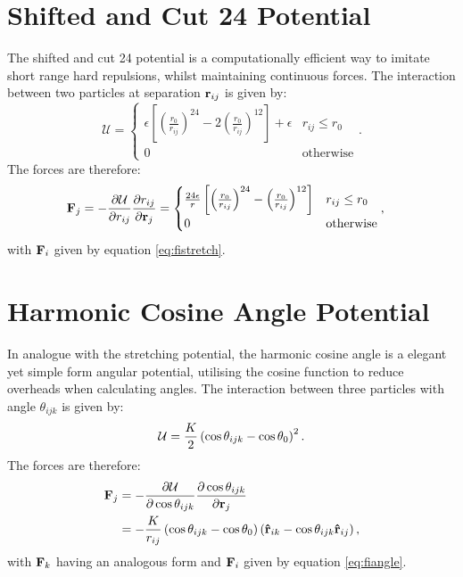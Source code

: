 \section{Shifted and Cut 24 Potential}

The shifted and cut 24 potential is a computationally efficient way to imitate short range hard repulsions, whilst maintaining continuous forces.
The interaction between two particles at separation $\mathbf{r}_{ij}$ is given by:
\begin{equation}
	\mathcal{U} = 
	\begin{cases}
	\epsilon \left[ \left(\frac{r_{0}}{r_{ij}}\right)^{24}-2\left(\frac{r_{0}}{r_{ij}}\right)^{12} \right] + \epsilon & r_{ij}\leq r_{0} \\
	0 & \text{otherwise}
	\end{cases}.
\end{equation}
The forces are therefore:
\begin{align}
	\mathbf{F}_j&=-\frac{\partial \mathcal{U}}{\partial r_{ij}} \frac{\partial r_{ij}}{\partial \mathbf{r}_j} = \begin{cases}
	\frac{24\epsilon}{r} \left[ \left(\frac{r_{0}}{r_{ij}}\right)^{24}-\left(\frac{r_{0}}{r_{ij}}\right)^{12} \right] & r_{ij}\leq r_{0} \\
	0 & \text{otherwise}
	\end{cases}    ,
\end{align}
with $\mathbf{F}_i$ given by equation \eqref{eq:fistretch}.

\section{Harmonic Cosine Angle Potential}

In analogue with the stretching potential, the harmonic cosine angle is a elegant yet simple form angular potential, utilising the cosine function to reduce overheads when calculating angles.
The interaction between three particles with angle $\theta_{ijk}$ is given by:
\begin{equation}
	\mathcal{U} = \frac{K}{2}\left(\cos\theta_{ijk}-\cos\theta_0\right)^2.
\end{equation}
The forces are therefore:
\begin{align}
	\mathbf{F}_j&=-\frac{\partial \mathcal{U}}{\partial \cos\theta_{ijk}} \frac{\partial \cos\theta_{ijk}}{\partial \mathbf{r}_j} \nonumber \\ 
	&=-\frac{K}{r_{ij}}\left(\cos\theta_{ijk}-\cos\theta_0\right)\left(\boldsymbol{\hat{\mathbf{r}}}_{ik}-\cos\theta_{ijk}\boldsymbol{\hat{\mathbf{r}}}_{ij}\right) ,
\end{align}
with $\mathbf{F}_k$ having an analogous form and $\mathbf{F}_i$ given by equation \eqref{eq:fiangle}.

